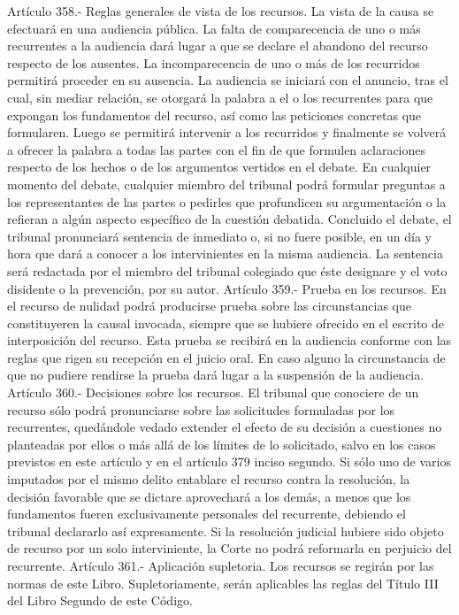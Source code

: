     Artículo 358.- Reglas generales de vista de los recursos. La vista de la causa se efectuará en una audiencia pública.
    La falta de comparecencia de uno o más recurrentes a la audiencia dará lugar a que se declare el abandono del recurso respecto de los ausentes. La incomparecencia de uno o más de los recurridos permitirá proceder en su ausencia.
    La audiencia se iniciará con el anuncio, tras el cual, sin mediar relación, se otorgará la palabra a el o los recurrentes para que expongan los fundamentos del recurso, así como las peticiones concretas que formularen. Luego se permitirá intervenir a los recurridos y finalmente se volverá a ofrecer la palabra a todas las partes con el fin de que formulen aclaraciones respecto de los hechos o de los argumentos vertidos en el debate.
    En cualquier momento del debate, cualquier miembro del tribunal podrá formular preguntas a los representantes de las partes o pedirles que profundicen su argumentación o la refieran a algún aspecto específico de la cuestión debatida.
    Concluido el debate, el tribunal pronunciará sentencia de inmediato o, si no fuere posible, en un día y hora que dará a conocer a los intervinientes en la misma audiencia. La sentencia será redactada por el miembro del tribunal colegiado que éste designare y el voto disidente o la prevención, por su autor.
    Artículo 359.- Prueba en los recursos. En el recurso de nulidad podrá producirse prueba sobre las circunstancias que constituyeren la causal invocada, siempre que se hubiere ofrecido en el escrito de interposición del recurso.
    Esta prueba se recibirá en la audiencia conforme con las reglas que rigen su recepción en el juicio oral. En caso alguno la circunstancia de que no pudiere rendirse la prueba dará lugar a la suspensión de la audiencia.
    Artículo 360.- Decisiones sobre los recursos. El tribunal que conociere de un recurso sólo podrá pronunciarse sobre las solicitudes formuladas por los recurrentes, quedándole vedado extender el efecto de su decisión a cuestiones no planteadas por ellos o más allá de los límites de lo solicitado, salvo en los casos previstos en este artículo y en el artículo 379 inciso segundo.
    Si sólo uno de varios imputados por el mismo delito entablare el recurso contra la resolución, la decisión favorable que se dictare aprovechará a los demás, a menos que los fundamentos fueren exclusivamente personales del recurrente, debiendo el tribunal declararlo así expresamente.
    Si la resolución judicial hubiere sido objeto de recurso por un solo interviniente, la Corte no podrá reformarla en perjuicio del recurrente.
    Artículo 361.- Aplicación supletoria. Los recursos se regirán por las normas de este Libro. Supletoriamente, serán aplicables las reglas del Título III del Libro Segundo de este Código.


